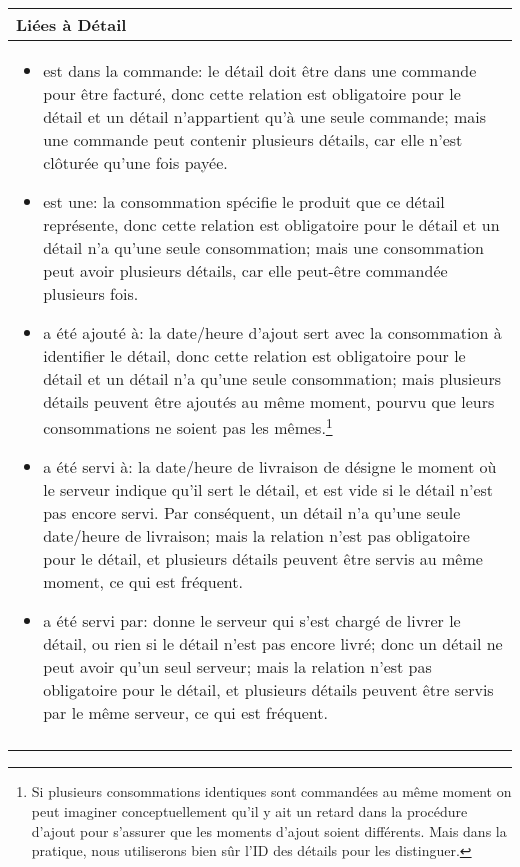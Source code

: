 \documentclass[a4paper,10pt]{article}
\begin{document}
\begin{tabu}{X}
\textbf{Liées à Détail}\\
\toprule

\begin{itemize}
    \item est dans la commande: le détail doit être dans une commande pour être facturé, donc cette relation est obligatoire pour le détail et un détail n'appartient qu'à une seule commande; mais une commande peut contenir plusieurs détails, car elle n'est clôturée qu'une fois payée.
    \item est une: la consommation spécifie le produit que ce détail représente, donc cette relation est obligatoire pour le détail et un détail n'a qu'une seule consommation; mais une consommation peut avoir plusieurs détails, car elle peut-être commandée plusieurs fois.
    \item a été ajouté à: la date/heure d'ajout sert avec la consommation à identifier le détail, donc cette relation est obligatoire pour le détail et un détail n'a qu'une seule consommation; mais plusieurs détails peuvent être ajoutés au même moment, pourvu que leurs consommations ne soient pas les mêmes.\footnote{Si plusieurs consommations identiques sont commandées au même moment on peut imaginer conceptuellement qu'il y ait un retard dans la procédure d'ajout pour s'assurer que les moments d'ajout soient différents. Mais dans la pratique, nous utiliserons bien sûr l'ID des détails pour les distinguer.}
    \item a été servi à: la date/heure de livraison de désigne le moment où le serveur indique qu'il sert le détail, et est vide si le détail n'est pas encore servi. Par conséquent, un détail n'a qu'une seule date/heure de livraison; mais la relation n'est pas obligatoire pour le détail, et plusieurs détails peuvent être servis au même moment, ce qui est fréquent.
    \item a été servi par: donne le serveur qui s'est chargé de livrer le détail, ou rien si le détail n'est pas encore livré; donc un détail ne peut avoir qu'un seul serveur; mais la relation n'est pas obligatoire pour le détail, et plusieurs détails peuvent être servis par le même serveur, ce qui est fréquent.
\end{itemize}
\\\\
\end{tabu}
\end{document}
